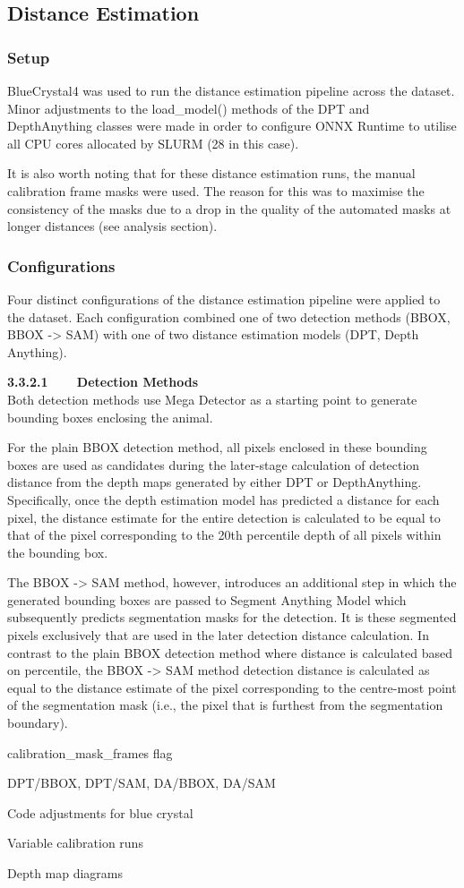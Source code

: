 \subsection{Distance Estimation}

\subsubsection{Setup}

BlueCrystal4 was used to run the distance estimation pipeline across the dataset.
Minor adjustments to the load\_model() methods of the DPT and DepthAnything classes
were made in order to configure ONNX Runtime to utilise all CPU cores allocated by
SLURM (28 in this case).

It is also worth noting that for these distance estimation runs, the manual calibration
frame masks were used.
The reason for this was to maximise the consistency of the masks due to a drop in the
quality of the automated masks at longer distances (see analysis section).

\subsubsection{Configurations}

Four distinct configurations of the distance estimation pipeline were applied to the
dataset.
Each configuration combined one of two detection methods (BBOX, BBOX -> SAM) with one
of two distance estimation models (DPT, Depth Anything).

\vspace{3mm}

\textbf{3.3.2.1~~~~Detection Methods}\vspace{4.5mm}\\
Both detection methods use Mega Detector as a starting point to generate bounding boxes
enclosing the animal.

For the plain BBOX detection method, all pixels enclosed in these bounding boxes are used
as candidates during the later-stage calculation of detection distance from the depth maps
generated by either DPT or DepthAnything.
Specifically, once the depth estimation model has predicted a distance for each pixel, the
distance estimate for the entire detection is calculated to be equal to that of the pixel
corresponding to the 20th percentile depth of all pixels within the bounding box.

The BBOX -> SAM method, however, introduces an additional step in which the generated bounding
boxes are passed to Segment Anything Model which subsequently predicts segmentation masks for
the detection.
It is these segmented pixels exclusively that are used in the later detection distance calculation.
In contrast to the plain BBOX detection method where distance is calculated based on
percentile, the BBOX -> SAM method detection distance is calculated as equal to the distance
estimate of the pixel corresponding to the centre-most point of the segmentation mask (i.e., the pixel
that is furthest from the segmentation boundary).

calibration\_mask\_frames flag





DPT/BBOX, DPT/SAM, DA/BBOX, DA/SAM

Code adjustments for blue crystal

Variable calibration runs

Depth map diagrams
